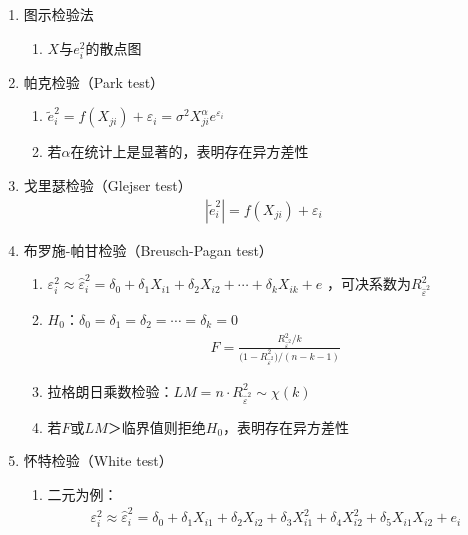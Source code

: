 \documentclass[12pt]{book}
\begin{document}
\begin{enumerate}[1.]
    \item 图示检验法
          \begin{enumerate}[(1)]
              \item $X$与$e_i^2$的散点图
          \end{enumerate}
    \item 帕克检验（Park test）
          \begin{enumerate}[(1)]
              \item $\tilde{e} _i^2 =f(X_{ji})+\varepsilon_{i} =\sigma^2X_{ji}^\alpha e^{\varepsilon_i}$
              \item 若$\alpha$在统计上是显著的，表明存在异方差性
          \end{enumerate}
    \item 戈里瑟检验（Glejser test）
          \begin{gather*}
              \left|{\widetilde{e}}_i^2\right| =f\left(X_{ji}\right)+\varepsilon_i
          \end{gather*}
    \item 布罗施-帕甘检验（Breusch-Pagan test）
          \begin{enumerate}[(1)]
              \item $\varepsilon_i^2\approx{\hat{\varepsilon}}_i^2=\delta_0+\delta_1X_{i1}+\delta_2X_{i2}+\cdots+\delta_kX_{ik}+e$ ，可决系数为$R_{{\hat{\varepsilon}}^2}^2$
              \item $H_0$：$δ_0=δ_1=δ_2=\cdots=δ_k=0$
                    \begin{gather*}
                        F =  \frac{ R_{{\hat{\varepsilon}}^2}^2/k}{ {(1-R}_{{\hat{\varepsilon}}^2}^2)/(n-k-1)}
                    \end{gather*}
              \item 拉格朗日乘数检验：$LM=n⋅R_{{\hat{\varepsilon}}^2}^2\sim \chi(k)$
              \item 若$F$或$LM$＞临界值则拒绝$H_0$，表明存在异方差性
          \end{enumerate}
    \item 怀特检验（White test）
          \begin{enumerate}[(1)]
              \item 二元为例：
                    \begin{gather*}
                        \varepsilon_i^2\approx{\hat{\varepsilon}}_i^2=\delta_0+\delta_1X_{i1}+\delta_2X_{i2}+\delta_3X_{i1}^2+\delta_4X_{i2}^2+\delta_5X_{i1}X_{i2}+e_i \\

\end{gather*}
\end{enumerate}
\end{enumerate}
\end{document}

